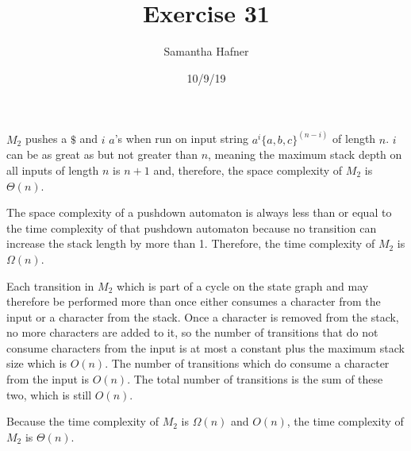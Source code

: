 \documentclass[12pt]{article}
\title{Exercise 31}
\author{Samantha Hafner}
\date{10/9/19}
\begin{document}
\maketitle

$M_2$ pushes a $\$$ and $i$ $a$'s when run on input string $a^i\{a,b,c\}^{(n-i)}$ of length $n$. $i$ can be as great as but not greater than $n$, meaning the maximum stack depth on all inputs of length $n$ is $n+1$ and, therefore, the space complexity of $M_2$ is $\Theta(n)$.

The space complexity of a pushdown automaton is always less than or equal to the time complexity of that pushdown automaton because no transition can increase the stack length by more than 1. Therefore, the time complexity of $M_2$ is $\Omega(n)$.

Each transition in $M_2$ which is part of a cycle on the state graph and may therefore be performed more than once either consumes a character from the input or a character from the stack. Once a character is removed from the stack, no more characters are added to it, so the number of transitions that do not consume characters from the input is at most a constant plus the maximum stack size which is $O(n)$. The number of transitions which do consume a character from the input is $O(n)$. The total number of transitions is the sum of these two, which is still $O(n)$.

Because the time complexity of $M_2$ is $\Omega(n)$ and $O(n)$, the time complexity of $M_2$ is $\Theta(n)$.
\end{document}
